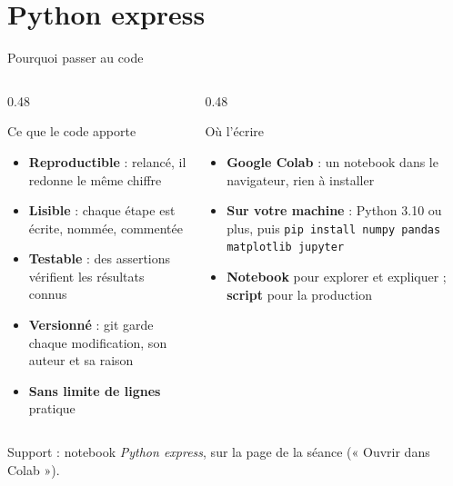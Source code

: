 \documentclass[10pt,aspectratio=169]{beamer}
\newcommand{\fx}[1]{\texttt{\small #1}}
\begin{document}
\section{Python express}

\begin{frame}{Pourquoi passer au code}
\begin{columns}[T]
\begin{column}{0.48\textwidth}
\begin{block}{Ce que le code apporte}
\begin{itemize}
  \item \textbf{Reproductible} : relancé, il redonne le même chiffre
  \item \textbf{Lisible} : chaque étape est écrite, nommée, commentée
  \item \textbf{Testable} : des assertions vérifient les résultats connus
  \item \textbf{Versionné} : git garde chaque modification, son auteur et sa raison
  \item \textbf{Sans limite de lignes} pratique
\end{itemize}
\end{block}
\end{column}
\begin{column}{0.48\textwidth}
\begin{block}{Où l'écrire}
\begin{itemize}
  \item \textbf{Google Colab} : un notebook dans le navigateur, rien à installer
  \item \textbf{Sur votre machine} : Python 3.10 ou plus, puis \fx{pip install numpy pandas matplotlib jupyter}
  \item \textbf{Notebook} pour explorer et expliquer ; \textbf{script} pour la production
\end{itemize}
\end{block}
\end{column}
\end{columns}
\vspace{0.2cm}
\begin{center}\small Support : notebook \emph{Python express}, sur la page de la séance (« Ouvrir dans Colab »).\end{center}
\end{frame}
\end{document}

